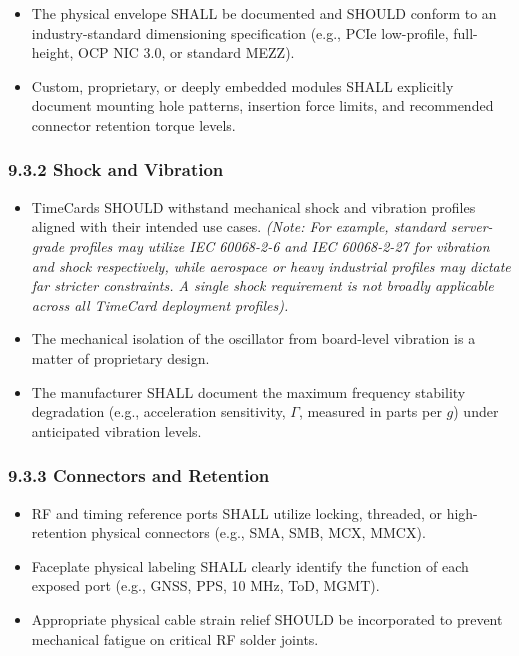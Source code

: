 \begin{itemize}
\tightlist
\item
  The physical envelope SHALL be documented and SHOULD conform to an
  industry-standard dimensioning specification (e.g., PCIe low-profile,
  full-height, OCP NIC 3.0, or standard MEZZ).\\
\item
  Custom, proprietary, or deeply embedded modules SHALL explicitly
  document mounting hole patterns, insertion force limits, and
  recommended connector retention torque levels.
\end{itemize}

\subsubsection{9.3.2 Shock and Vibration}\label{shock-and-vibration}

\begin{itemize}
\tightlist
\item
  TimeCards SHOULD withstand mechanical shock and vibration profiles
  aligned with their intended use cases. \emph{(Note: For example,
  standard server-grade profiles may utilize IEC 60068-2-6 and IEC
  60068-2-27 for vibration and shock respectively, while aerospace or
  heavy industrial profiles may dictate far stricter constraints. A
  single shock requirement is not broadly applicable across all TimeCard
  deployment profiles).}\\
\item
  The mechanical isolation of the oscillator from board-level vibration
  is a matter of proprietary design.\\
\item
  The manufacturer SHALL document the maximum frequency stability
  degradation (e.g., acceleration sensitivity, \(\Gamma\), measured in
  parts per \(g\)) under anticipated vibration levels.
\end{itemize}

\subsubsection{9.3.3 Connectors and
Retention}\label{connectors-and-retention}

\begin{itemize}
\tightlist
\item
  RF and timing reference ports SHALL utilize locking, threaded, or
  high-retention physical connectors (e.g., SMA, SMB, MCX, MMCX).\\
\item
  Faceplate physical labeling SHALL clearly identify the function of
  each exposed port (e.g., GNSS, PPS, 10 MHz, ToD, MGMT).\\
\item
  Appropriate physical cable strain relief SHOULD be incorporated to
  prevent mechanical fatigue on critical RF solder joints.
\end{itemize}

